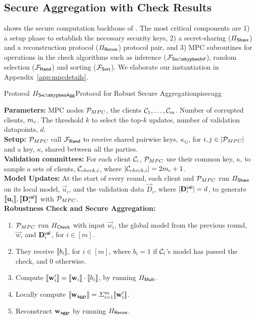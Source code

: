 \subsection{Secure Aggregation with Check Results}
\label{sec:slvr-protocol}

 shows the secure computation backbone of \ours. The most critical components are 1) a setup phase to establish the necessary security keys, 2) a secret-sharing ($\Pi_{\mathsf{Share}}$) and a reconstruction protocol ($\Pi_{\mathsf{Recon}}$) protocol pair, and 3) MPC subroutines for operations in the check algorithms such as inference ($\FSecInf$), random selection ($\mathcal{F}_{\mathsf{Rand}}$) and sorting ($\mathcal{F}_{\mathsf{Sort}}$).
We elaborate our instantiation in Appendix~\ref{app:mpcdetails}.


\begin{protofig}{Protocol $\PSecAgg$}{Protocol for Robust Secure Aggregation}{pisecagg}
\label{proto:ours-acc}

\textbf{Parameters:} MPC nodes $\mathcal{P}_{MPC}$, the clients $\mathcal{C}_1, \ldots, \mathcal{C}_m$. Number of corrupted clients, $m_c$. The threshold $k$ to select the top-$k$ updates, number of validation datapoints, $d$. \\

\textbf{Setup:} $\mathcal{P}_{MPC}$ call $\mathcal{F}_{\mathsf{Rand}}$ to receive shared pairwise keys, $\kappa_{ij}$, for $i, j \in |\mathcal{P}_{MPC}|$ and a key, $\kappa$, shared between all the parties. \\

\textbf{Validation committees:} For each client $\mathcal{C}_i$, $\mathcal{P}_{MPC}$ use their common key, $\kappa$, to sample a sets of clients, $\mathcal{C}_{check, i}$, where $|\mathcal{C}_{check, i}| = 2 m_c + 1$. \\

\textbf{Model Updates:} At the start of every round, each client and $\mathcal{P}_{MPC}$ run $\Pi_{\mathsf{Share}}$ on its local model, $\vec u_i$, and the validation data $\vec D_i$,  where $|{\mathbf{D}}^{\mathsf{val}}_i| = d$, to generate $\llbracket {\ensuremath{\mathbf{u}}}_i\rrbracket, \llbracket {\ensuremath{\mathbf{D}}}^{\mathsf{val}}_i\rrbracket$ with $\mathcal{P}_{MPC}$. \\

\textbf{Robustness Check and Secure Aggregation:} 
\begin{enumerate}
    \item $\mathcal{P}_{MPC}$ run $\Pi_{\mathsf{Check}}$ with input $\vec w_i$, the global model from the previous round, $\vec w$, and ${\mathbf{D}}^{\mathsf{val}}_i$, for $i \in [m]$. 
    \item They receive $\llbracket b_i\rrbracket$, for $i \in [m]$, where $b_i = 1$ if $\mathcal{C}_i$'s model has passed the check, and 0 otherwise.
    \item Compute $\llbracket {\ensuremath{\mathbf{w}}}'_i\rrbracket = \llbracket {\ensuremath{\mathbf{w}}}_i\rrbracket \cdot \llbracket b_i\rrbracket$, by running $\Pi_{\mathsf{Mult}}$.
    \item Locally compute $\llbracket {\ensuremath{\mathbf{w}}}_{\mathsf{aggr}}\rrbracket = \Sigma_{i = 1}^m \llbracket {\ensuremath{\mathbf{w}}}'_i\rrbracket$.
    \item Reconstruct ${\mathbf{w}}_{\mathsf{aggr}}$ by running $\Pi_{\mathsf{Recon}}$.
\end{enumerate}

\end{protofig}




